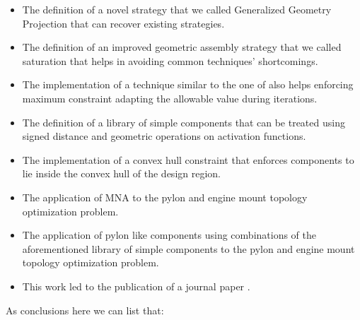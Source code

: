 \begin{itemize}
\item The definition of a novel strategy that we called Generalized Geometry Projection that can recover existing strategies.
\item The definition of an improved geometric assembly strategy that we called saturation that helps in avoiding common techniques' shortcomings.
\item The implementation of a technique similar to the one of \cite{le2010stress} also helps enforcing maximum constraint adapting the allowable value during iterations. 
\item The definition of a library of simple components that can be treated using signed distance and geometric operations on activation functions.
\item The implementation of a convex hull constraint that enforces components to lie inside the convex hull of the design region.
\item The application of MNA to the pylon and engine mount topology optimization problem.
\item The application of pylon like components using combinations of the aforementioned library of simple components to the pylon and engine mount topology optimization problem.
\item This work led to the publication of a journal paper \cite{coniglio2019generalized}.
\end{itemize}
As conclusions here we can list that:
